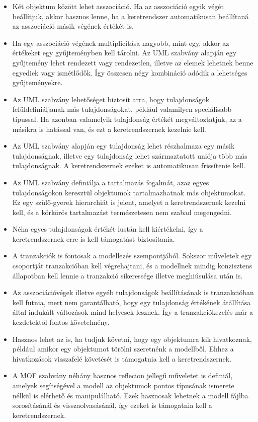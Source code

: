 \documentclass[12pt, a4paper]{report}
\begin{document}
\begin{itemize}
	\item Két objektum között lehet asszociáció. Ha az asszociáció egyik végét beállítjuk, akkor hasznos lenne, ha a keretrendszer automatikusan beállítaná az asszociáció másik végének értékét is.
	\item Ha egy asszociáció végének multiplicitása nagyobb, mint egy, akkor az értékeket egy gyűjteményben kell tárolni. Az UML szabvány alapján egy gyűjtemény lehet rendezett vagy rendezetlen, illetve az elemek lehetnek benne egyediek vagy ismétlődők. Így összesen négy kombináció adódik a lehetséges gyűjteményekre.
	\item Az UML szabvány lehetőséget biztosít arra, hogy tulajdonságok felüldefiniáljanak más tulajdonságokat, például valamilyen speciálisabb típussal. Ha azonban valamelyik tulajdonság értékét megváltoztatjuk, az a másikra is hatással van, és ezt a keretrendszernek kezelnie kell.
	\item Az UML szabvány alapján egy tulajdonság lehet részhalmaza egy másik tulajdonságnak, illetve egy tulajdonság lehet származtatott uniója több más tulajdonságnak. A keretrendszernek ezeket is automatikusan frissítenie kell.
	\item Az UML szabvány definiálja a tartalmazás fogalmát, azaz egyes tulajdonságokon keresztül objektumok tartalmazhatnak más objektumokat. Ez egy szülő-gyerek hierarchiát is jelent, amelyet a keretrendszernek kezelni kell, és a körkörös tartalmazást természetesen nem szabad megengedni.
	\item Néha egyes tulajdonságok értékét lustán kell kiértékelni, így a keretrendszernek erre is kell támogatást biztosítania.
	\item A tranzakciók is fontosak a modellezés szempontjából. Sokszor műveletek egy csoportját tranzakcióban kell végrehajtani, és a modellnek mindig konzisztens állapotban kell lennie a tranzakció sikeressége illetve meghiúsulása után is.
	\item Az asszociációvégek illetve egyéb tulajdonságok beállításának is tranzakcióban kell futnia, mert nem garantálható, hogy egy tulajdonság értékének átállítása által indukált változások mind helyesek lesznek. Így a tranzakciókezelés már a kezdetektől fontos követelmény.
	\item Hasznos lehet az is, ha tudjuk követni, hogy egy objektumra kik hivatkoznak, például amikor egy objektumot törölni szeretnénk a modellből. Ehhez a hivatkozások visszafelé követését is támogatnia kell a keretrendszernek.
	\item A MOF szabvány néhány hasznos reflecion jellegű műveletet is definiál, amelyek segítségével a modell az objektumok pontos típusának ismerete nélkül is elérhető és manipulálható. Ezek hasznosak lehetnek a modell fájlba sorosításánál és visszaolvasásánál, így ezeket is támogatnia kell a keretrendszernek.

\end{itemize}
\end{document}
